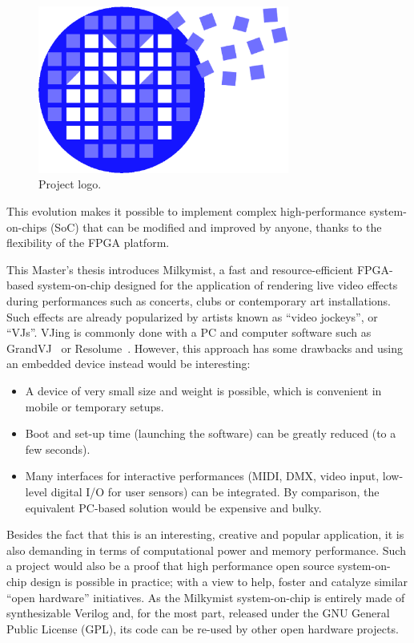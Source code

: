 \documentclass[a4paper,11pt]{kthesis}
\begin{document}
\begin{figure}
\centering
\includegraphics[height=55mm]{newlogo.eps}
\caption{Project logo.} \label{fig:projectlogo}
\end{figure}

This evolution makes it possible to implement complex high-performance system-on-chips (SoC) that can be modified and improved by anyone, thanks to the flexibility of the FPGA platform.

This Master's thesis introduces Milkymist\texttrademark \cite{milkymist}, a fast and resource-efficient FPGA-based system-on-chip designed for the application of rendering live video effects during performances such as concerts, clubs or contemporary art installations. Such effects are already popularized by artists known as ``video jockeys'', or ``VJs''. VJing is commonly done with a PC and computer software such as GrandVJ~\cite{grandvj} or Resolume~\cite{resolume}. However, this approach has some drawbacks and using an embedded device instead would be interesting:
\begin{itemize}
\item A device of very small size and weight is possible, which is convenient in mobile or temporary setups.
\item Boot and set-up time (launching the software) can be greatly reduced (to a few seconds).
\item Many interfaces for interactive performances (MIDI, DMX, video input, low-level digital I/O for user sensors) can be integrated. By comparison, the equivalent PC-based solution would be expensive and bulky.
\end{itemize}

Besides the fact that this is an interesting, creative and popular application, it is also demanding in terms of computational power and memory performance. Such a project would also be a proof that high performance open source system-on-chip design is possible in practice; with a view to help, foster and catalyze similar ``open hardware'' initiatives. As the Milkymist system-on-chip is entirely made of synthesizable Verilog and, for the most part, released under the GNU General Public License (GPL), its code can be re-used by other open hardware projects.
\end{document}
